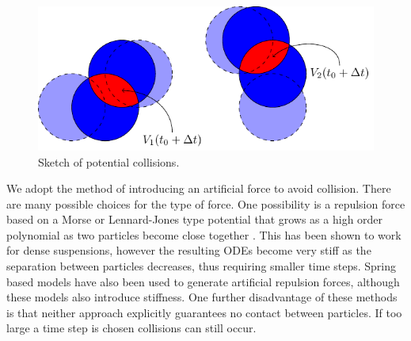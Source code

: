 \documentclass[preprint, 10pt]{elsarticle}
\begin{document}
\begin{figure}[!h]\label{fig:collision_sketch}
\begin{center}
\includegraphics{figures/collisions.pdf}
\end{center}
\caption{Sketch of potential collisions.}
\end{figure}

We adopt the method of introducing an artificial force to avoid
collision. There are many possible choices for the type of force. One
possibility is a repulsion force based on a Morse or Lennard-Jones type
potential that grows as a high order polynomial as two particles become
close together \cite{Flormann2017, Liu2006}. This has been shown to work
for dense suspensions, however the resulting ODEs become very stiff as
the separation between particles decreases, thus requiring smaller time
steps. Spring based models \cite{Tsubota2006, Zhao2013, Kabacogulu2017}
 have also been used to
generate artificial repulsion forces, although these models also
introduce stiffness. One further disadvantage of these methods is that
neither approach explicitly guarantees no contact between particles. If
too large a time step is chosen collisions can still occur. 

\end{document}
